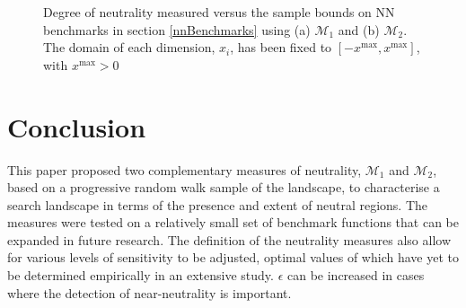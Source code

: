\documentclass[conference]{IEEEtran}
\begin{document}
\begin{figure}[!t]
	\centering
	\label{figNNM1}	
	
	\label{figNNM2}	
	\caption{Degree of neutrality measured versus the sample bounds on NN benchmarks in section \ref{nnBenchmarks} using (a) ${\mathcal{M}_1}$ and (b) ${\mathcal{M}_2}$. The domain of each dimension, $x_i$, has been fixed to $[-x^{\text{max}}, x^{\text{max}}]$, with $x^{\text{max}} > 0$}
	\label{figNNNeutralityVsDomain}
\end{figure}

\section{Conclusion}
This paper proposed two complementary measures of neutrality, ${\mathcal{M}_1}$ and ${\mathcal{M}_2}$, based on a progressive random walk sample of the landscape, to characterise a search landscape in terms of the presence and extent of neutral regions. The measures were tested on a relatively small set of benchmark functions that can be expanded in future research. The definition of the neutrality measures also allow for various levels of sensitivity to be adjusted, optimal values of which have yet to be determined empirically in an extensive study. $\epsilon$ can be increased in cases where the detection of near-neutrality is important. 
\end{document}
